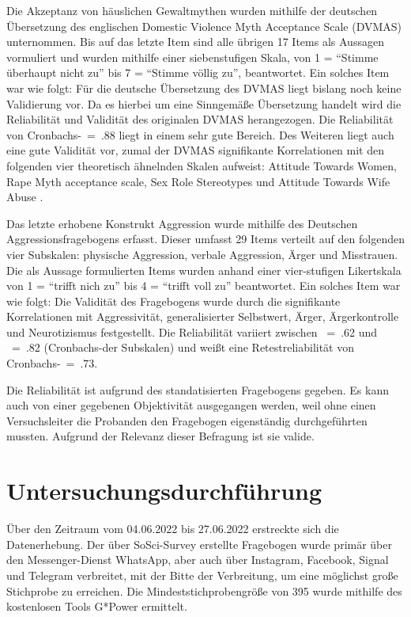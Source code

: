 Die Akzeptanz von häuslichen Gewaltmythen wurden mithilfe der deutschen Übersetzung des englischen Domestic Violence Myth Acceptance Scale (DVMAS) \parencite{Peters2003} unternommen. Bis auf das letzte Item sind alle übrigen 17 Items als Aussagen vormuliert und wurden mithilfe einer siebenstufigen Skala, von 1 = \enquote{Stimme überhaupt nicht zu} bis 7 = \enquote{Stimme völlig zu}, beantwortet. Ein solches Item war wie folgt: %
Für die deutsche Übersetzung des DVMAS liegt bislang noch keine Validierung vor. Da es hierbei um eine Sinngemäße Übersetzung handelt wird die Reliabilität und Validität des originalen DVMAS herangezogen. Die Reliabilität von Cronbachs-\textalpha~=~.88 liegt in einem sehr gute Bereich. Des Weiteren liegt auch eine gute Validität vor, zumal der DVMAS signifikante Korrelationen mit den folgenden vier theoretisch ähnelnden Skalen aufweist: Attitude Towards Women, Rape Myth acceptance scale, Sex Role Stereotypes und Attitude Towards Wife Abuse \parencite{DVMAS_Peters}.

Das letzte erhobene Konstrukt Aggression wurde mithilfe des Deutschen Aggressionsfragebogens erfasst. Dieser umfasst 29 Items verteilt auf den folgenden vier Subskalen: physische Aggression, verbale Aggression, Ärger und Misstrauen. Die als Aussage formulierten Items wurden anhand einer vier-stufigen Likertskala von 1 = \enquote{trifft nich zu} bis 4 = \enquote{trifft voll zu} beantwortet. Ein solches Item war wie folgt: %
Die Validität des Fragebogens wurde durch die signifikante Korrelationen mit Aggressivität, generalisierter Selbstwert, Ärger, Ärgerkontrolle und Neurotizismus festgestellt. Die Reliabilität variiert zwischen \textalpha~=~.62 und \textalpha~=~.82 (Cronbachs-\textalpha der Subskalen) und weißt eine Retestreliabilität von Cronbachs-\textalpha~=~.73\parencite{Aggressionsfragebogen}.

Die Reliabilität ist aufgrund des standatisierten Fragebogens gegeben. Es kann auch von einer gegebenen Objektivität ausgegangen werden, weil ohne einen Versuchsleiter die Probanden den Fragebogen eigenständig durchgeführten mussten. Aufgrund der Relevanz dieser Befragung ist sie valide.



\section{Untersuchungsdurchführung}   \label{sec_3.4}
Über den Zeitraum vom 04.06.2022 bis 27.06.2022 erstreckte sich die Datenerhebung. Der über SoSci-Survey erstellte Fragebogen wurde primär über den Messenger-Dienst WhatsApp, aber auch über Instagram, Facebook, Signal und Telegram verbreitet, mit der Bitte der Verbreitung, um eine möglichst große Stichprobe zu erreichen. Die Mindeststichprobengröße von 395 wurde mithilfe des kostenlosen Tools G*Power ermittelt. %

